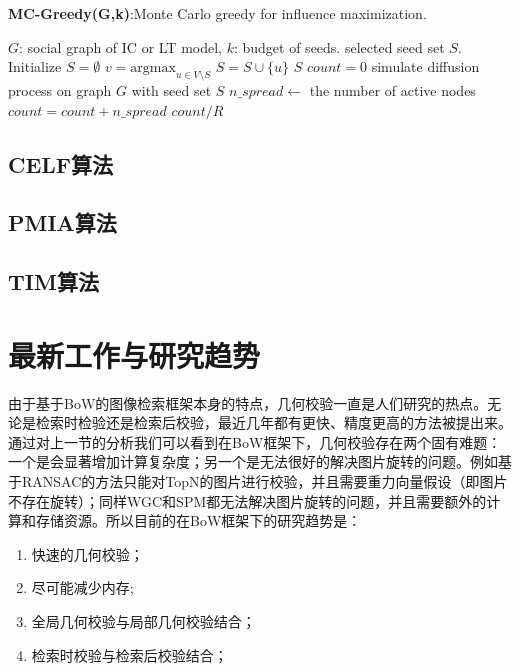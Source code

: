 \begin{algorithm}
	\caption{\textbf{MC-Greedy(G,k)}:Monte Carlo greedy for influence maximization.}
	\label{alg:mc_greed} 
	\begin{algorithmic}[1]
		\Require $G$: social graph of IC or LT model, $k$: budget of seeds.
		\Ensure selected seed set $S$.
		\State Initialize $S = \emptyset$
			\State $v = \mathrm{argmax}_{u \in V \setminus S}$ 
			\State $S = S \cup \{u\}$
		\EndFor
		\State \Return $S$
			\State $count=0$
				\State simulate diffusion process on graph $G$ with seed set $S$
				\State $n\_spread \gets$ the number of active nodes
				\State $count = count + n\_spread$
			\EndFor
			\State \Return $count/R$
		\EndFunction
	\end{algorithmic} 
\end{algorithm}

\subsection{CELF算法}

\subsection{PMIA算法}

\subsection{TIM算法}



\section{最新工作与研究趋势}
由于基于BoW的图像检索框架本身的特点，几何校验一直是人们研究的热点。无论是检索时检验还是检索后校验，最近几年都有更快、精度更高的方法被提出来。通过对上一节的分析我们可以看到在BoW框架下，几何校验存在两个固有难题：一个是会显著增加计算复杂度；另一个是无法很好的解决图片旋转的问题。例如基于RANSAC的方法\cite{philbin2007object}\cite{chum2007total}只能对TopN的图片进行校验，并且需要重力向量假设（即图片不存在旋转）；同样WGC和SPM都无法解决图片旋转的问题，并且需要额外的计算和存储资源。所以目前的在BoW框架下的研究趋势是：
\begin{enumerate}
	\item 快速的几何校验；
	\item 尽可能减少内存;
	\item 全局几何校验与局部几何校验结合；
	\item 检索时校验与检索后校验结合；
\end{enumerate}

